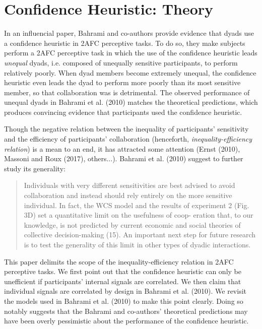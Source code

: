 \documentclass[12pt]{report}
\begin{document}
\chapter{Confidence Heuristic: Theory}
In an influencial paper, Bahrami and co-authors provide evidence that dyads use a confidence heuristic in 2AFC perceptive tasks. To do so, they make subjects perform a 2AFC perceptive task in which the use of the confidence heuristic leads \textit{unequal} dyads, i.e. composed of unequally sensitive participants, to perform relatively poorly. When dyad members become extremely unequal, the confidence heuristic even leads the dyad to perform more poorly than its most sensitive member, so that collaboration was is detrimental. The observed performance of unequal dyads in Bahrami et al. (2010) matches the theoretical predictions, which produces convincing evidence that participants used the confidence heuristic. 

Though the negative relation between the inequality of participants' sensitivity and the efficiency of participants' collaboration (henceforth, \textit{inequality-efficiency relation}) is a mean to an end, it has attracted some attention (Ernst (2010), Massoni and Roux (2017), others...). Bahrami et al. (2010) suggest to further study its generality: 

\begin{quote} Individuals with very
different sensitivities are best advised to avoid
collaboration and instead should rely entirely on
the more sensitive individual. In fact, the WCS
model and the results of experiment 2 (Fig. 3D)
set a quantitative limit on the usefulness of coop-
eration that, to our knowledge, is not predicted by
current economic and social theories of collective
decision-making (15). An important next step for
future research is to test the generality of this limit
in other types of dyadic interactions. \end{quote}

This paper delimits the scope of the inequality-efficiency relation in 2AFC perceptive tasks. We first point out that the confidence heuristic can only be unefficient if participants' internal signals are correlated. We then claim that individual signals are correlated by design in Bahrami et al. (2010). We revisit the models used in Bahrami et al. (2010) to make this point clearly. Doing so notably suggests that the Bahrami and co-authors' theoretical predictions may have been overly pessimistic about the performance of the confidence heuristic. 
\end{document}
